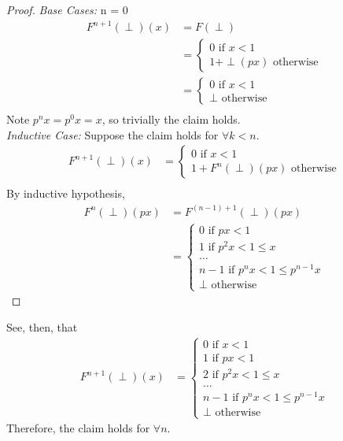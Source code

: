 \begin{proof}

\emph{Base Cases: } n = 0
\begin{align*}
F^{n+1}(\perp)(x) &= F(\perp) \\
&= 
\begin{cases}
0 \text{ if } x<1 \\
1 + \perp(px) \text{ otherwise}
\end{cases} \\
&=
\begin{cases}
0 \text{ if } x<1 \\
\perp \text{ otherwise}
\end{cases} \\
\end{align*}
Note $p^{n}x = p^0x = x$, so trivially the claim holds. \\
\emph{Inductive Case: } Suppose the claim holds for $\forall k < n$.
\begin{align*}
F^{n+1}(\perp)(x) &=  
\begin{cases}
0 \text{ if } x<1 \\
1 + F^{n}(\perp)(px) \text{ otherwise}
\end{cases} \\
\end{align*}
By inductive hypothesis,
\begin{align*}
F^{n}(\perp)(px) &= F^{(n-1) + 1}(\perp)(px) \\
&=  
 \begin{cases}
 0 \text{ if } px < 1 \\
 1 \text{ if } p^2x < 1 \leq x \\
 \dots \\
 n - 1 \text{ if }  p^{n}x < 1 \leq p^{n-1}x \\
 \perp \text{ otherwise}
 \end{cases}
 \end{align*}
\end{proof}
See, then, that
\begin{align*}
F^{n+1}(\perp)(x) &=  
\begin{cases}
0 \text{ if } x<1 \\
1 \text{ if } px < 1 \\
2 \text{ if } p^2x < 1 \leq x \\
\dots \\
n-1 \text{ if } p^{n}x < 1 \leq p^{n-1}x \\
\perp \text{ otherwise } 
\end{cases}
\end{align*}
Therefore, the claim holds for $\forall n$.

